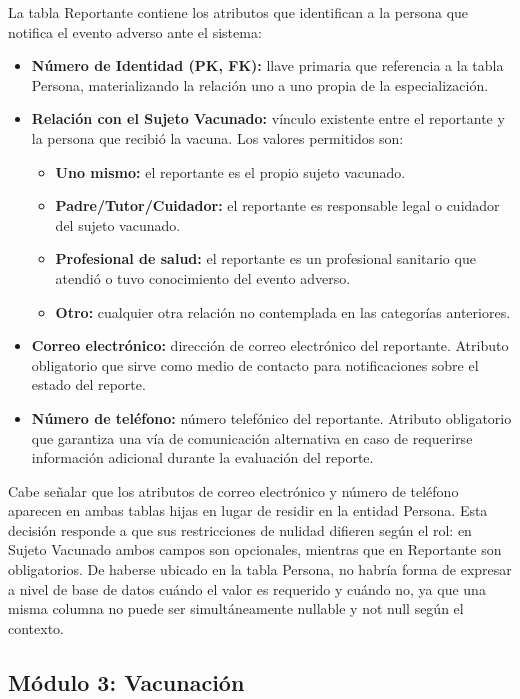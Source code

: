 La tabla Reportante contiene los atributos que identifican a la persona que notifica el evento adverso ante el sistema:
\begin{itemize}
    \item \textbf{Número de Identidad (PK, FK):} llave primaria que referencia a la tabla Persona, materializando la relación uno a uno propia de la especialización.
    \item \textbf{Relación con el Sujeto Vacunado:} vínculo existente entre el reportante y la persona que recibió la vacuna. Los valores permitidos son:
        \begin{itemize}
            \item \textbf{Uno mismo:} el reportante es el propio sujeto vacunado.
            \item \textbf{Padre/Tutor/Cuidador:} el reportante es responsable legal o cuidador del sujeto vacunado.
            \item \textbf{Profesional de salud:} el reportante es un profesional sanitario que atendió o tuvo conocimiento del evento adverso.
            \item \textbf{Otro:} cualquier otra relación no contemplada en las categorías anteriores.
        \end{itemize}
    \item \textbf{Correo electrónico:} dirección de correo electrónico del reportante. Atributo obligatorio que sirve como medio de contacto para notificaciones sobre el estado del reporte.
    \item \textbf{Número de teléfono:} número telefónico del reportante. Atributo obligatorio que garantiza una vía de comunicación alternativa en caso de requerirse información adicional durante la evaluación del reporte.
\end{itemize}

Cabe señalar que los atributos de correo electrónico y número de teléfono aparecen en ambas tablas hijas en lugar de residir en la entidad Persona. 
Esta decisión responde a que sus restricciones de nulidad difieren según el rol: en Sujeto Vacunado ambos campos son opcionales, mientras que en Reportante son obligatorios. 
De haberse ubicado en la tabla Persona, no habría forma de expresar a nivel de base de datos cuándo el valor es requerido y cuándo no, ya que una misma columna no puede ser simultáneamente nullable y not null según el contexto.


\subsection{Módulo 3: Vacunación}

